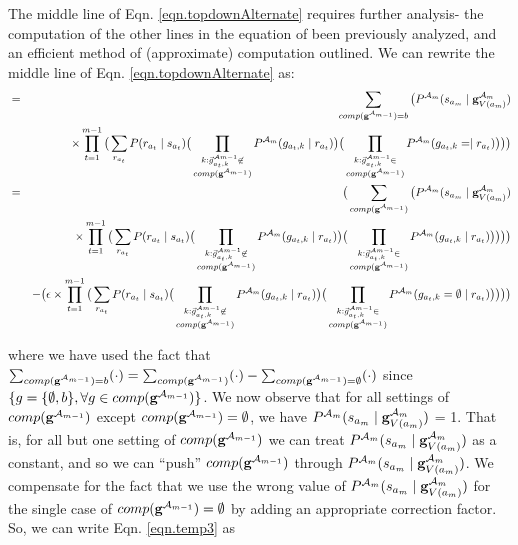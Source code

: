 \documentclass[11pt]{article}
\newcommand{\A}{{\cal A}}
\newcommand{\Am}{\A_{m}}
\newcommand{\gcompPrev}{comp(\mathbf{g}^{\A_{m-1}})}
\begin{document}
The middle line of Eqn. \ref{eqn.topdownAlternate} requires further analysis- the computation of the other lines in the equation of been previously analyzed, and an efficient method of (approximate) computation outlined. We can rewrite the middle line of Eqn. \ref{eqn.topdownAlternate} as:
%
\begin{eqnarray}
&=& \sum_{\gcompPrev=b} \big( P^{\Am}(s_{a_m} \mid \mathbf{g}^{\Am}_{V({a_m})}) \\
& & \times \prod_{t=1}^{m-1} \big( \sum_{r_{a_t}} P(r_{a_t} \mid s_{a_t}) \big( \prod_{\substack{k : \vec{g}^{\A{m-1}}_{a_t,k} \not \in \\ \gcompPrev }} P^{\Am}(g_{{a_t},k} \mid r_{a_t}) \big) \big( \prod_{\substack{k : \vec{g}^{\A{m-1}}_{a_t,k} \in \\ \gcompPrev }} P^{\Am}(g_{{a_t},k} = \mid r_{a_t}) \big) \big) \big) \nonumber\\
%
&=& \big( \sum_{\gcompPrev} \big( P^{\Am}(s_{a_m} \mid \mathbf{g}^{\Am}_{V({a_m})}) \label{eqn.temp3} \\
& & \times \prod_{t=1}^{m-1} \big( \sum_{r_{a_t}} P(r_{a_t} \mid s_{a_t}) \big( \prod_{\substack{k : \vec{g}^{\A{m-1}}_{a_t,k} \not \in \\ \gcompPrev }} P^{\Am}(g_{{a_t},k} \mid r_{a_t}) \big) \big( \prod_{\substack{k : \vec{g}^{\A{m-1}}_{a_t,k} \in \\ \gcompPrev }} P^{\Am}(g_{{a_t},k} \mid r_{a_t}) \big) \big) \big) \big) \nonumber\\
& &- \big( \epsilon \times \prod_{t=1}^{m-1} \big( \sum_{r_{a_t}} P(r_{a_t} \mid s_{a_t}) \big( \prod_{\substack{k : \vec{g}^{\A{m-1}}_{a_t,k} \not \in \\ \gcompPrev }} P^{\Am}(g_{{a_t},k} \mid r_{a_t}) \big) \big( \prod_{\substack{k : \vec{g}^{\A{m-1}}_{a_t,k} \in \\ \gcompPrev }} P^{\Am}(g_{{a_t},k} = \emptyset \mid r_{a_t}) \big) \big) \big) \big) \nonumber
\end{eqnarray}

where we have used the fact that $\sum_{\gcompPrev=b}(\cdot) = \sum_{\gcompPrev}(\cdot) - \sum_{\gcompPrev= \emptyset} (\cdot)$ since $\{ g=\{\emptyset, b\}, \forall g \in \gcompPrev\}$. We now observe that for all settings of $\gcompPrev$ except $\gcompPrev= \emptyset$, we have $P^{\Am}(s_{a_m} \mid \mathbf{g}^{\Am}_{V({a_m})})$ = 1. That is, for all but one setting of $\gcompPrev$ we can treat $P^{\Am}(s_{a_m} \mid \mathbf{g}^{\Am}_{V({a_m})})$ as a constant, and so we can ``push'' $\gcompPrev$ through $P^{\Am}(s_{a_m} \mid \mathbf{g}^{\Am}_{V({a_m})})$. We compensate for the fact that we use the wrong value of $P^{\Am}(s_{a_m} \mid \mathbf{g}^{\Am}_{V({a_m})})$ for the single case of $\gcompPrev= \emptyset$ by adding an appropriate correction factor. So, we can write  Eqn. \ref{eqn.temp3} as
\end{document}
